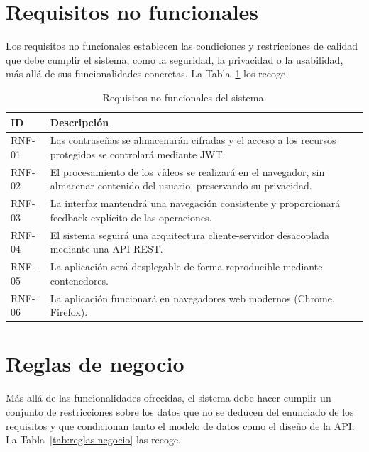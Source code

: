 \documentclass[12pt,a4paper,twoside,openright]{book}
\begin{document}
    \section{Requisitos no funcionales}

    Los requisitos no funcionales establecen las condiciones y restricciones de
    calidad que debe cumplir el sistema, como la seguridad, la privacidad o la
    usabilidad, más allá de sus funcionalidades concretas. La
    Tabla~\ref{tab:req-no-funcionales} los recoge.
    
    \begin{table}[htbp]
        \centering
        \begin{tabular}{l p{10cm}}
            \toprule
            \textbf{ID} & \textbf{Descripción} \\
            \midrule
            RNF-01 & Las contraseñas se almacenarán cifradas y el acceso a los recursos protegidos se controlará mediante JWT. \\
            RNF-02 & El procesamiento de los vídeos se realizará en el navegador, sin almacenar contenido del usuario, preservando su privacidad. \\
            RNF-03 & La interfaz mantendrá una navegación consistente y proporcionará feedback explícito de las operaciones. \\
            RNF-04 & El sistema seguirá una arquitectura cliente-servidor desacoplada mediante una API REST. \\
            RNF-05 & La aplicación será desplegable de forma reproducible mediante contenedores. \\
            RNF-06 & La aplicación funcionará en navegadores web modernos (Chrome, Firefox). \\
            \bottomrule
        \end{tabular}
        \caption{Requisitos no funcionales del sistema.}
        \label{tab:req-no-funcionales}
    \end{table}

    \section{Reglas de negocio}

    Más allá de las funcionalidades ofrecidas, el sistema debe hacer cumplir un
    conjunto de restricciones sobre los datos que no se deducen del enunciado
    de los requisitos y que condicionan tanto el modelo de datos como el diseño
    de la API. La Tabla~\ref{tab:reglas-negocio} las recoge.
\end{document}
